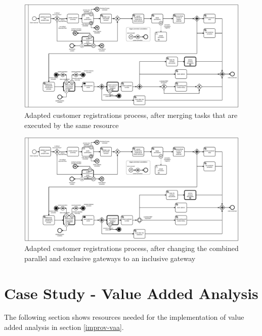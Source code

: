 \begin{figure}[H]
	\centering
	\includegraphics[width=1.7\columnwidth, angle=90]{graphics/register-customer/4-registercustomer-merge-bpmn.pdf}
	\caption{Adapted customer registrations process, after merging tasks that are executed by the same resource} 
	\label{fig:process-merge} 
\end{figure}

\begin{figure}[H]
	\centering
	\includegraphics[width=1.7\columnwidth, angle=90]{graphics/register-customer/5-registercustomer-exclusive-bpmn.pdf}
	\caption{Adapted customer registrations process, after changing the combined parallel and exclusive gateways to an inclusive gateway } 
	\label{fig:process-inclusive} 
\end{figure}
\restoregeometry
\section{Case Study - Value Added Analysis}\label{BPMN-vaa}
The following section shows resources needed for the implementation of value added analysis in section \ref{improv-vaa}.

